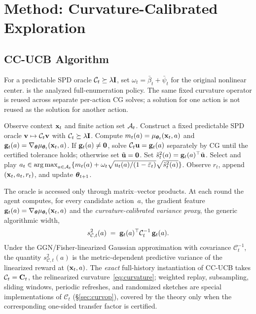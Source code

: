 \documentclass[twoside]{article}
\newcommand{\Calg}{\mathcal{C}}                 %
\begin{document}
\section{Method: Curvature-Calibrated Exploration}\label{sec:method}

\subsection{CC-UCB Algorithm}

For a predictable SPD oracle $\Calg_t\succeq\lambda\bI$, set
$\omega_t=\bar\beta_t+\bar\psi_t$ for the original nonlinear center.
 is the analyzed full-enumeration policy.  The same fixed
curvature operator is reused across separate per-action CG solves; a solution
for one action is not reused as the solution for another action.
\begin{algorithm}[H]
\caption{Curvature-Calibrated UCB (CC-UCB)}\label{alg:ccucb}
\begin{algorithmic}[1]
\STATE Observe context $\mathbf{x}_t$ and finite action set $\mathcal{A}_t$.
\STATE Construct a fixed predictable SPD oracle $\bv\mapsto\Calg_t\bv$ with $\Calg_t\succeq\lambda\bI$.
  \STATE Compute $m_t(a)=\mu_{\boldsymbol{\theta}_t}(\mathbf{x}_t,a)$ and $\mathbf{g}_t(a)=\nabla_{\boldsymbol{\theta}}\mu_{\boldsymbol{\theta}_t}(\mathbf{x}_t,a)$.
  \STATE If $\mathbf{g}_t(a)\ne\mathbf0$, solve $\Calg_t\bu=\bg_t(a)$ separately by CG until the certified tolerance holds; otherwise set $\tilde{\mathbf{u}}=\mathbf0$. \label{line:cg}
  \STATE Set $\tilde s_t^2(a)=\mathbf{g}_t(a)^\top\tilde{\mathbf{u}}$.
\ENDFOR
\STATE Select and play $a_t\in\operatorname*{arg\,max}_{a\in\mathcal{A}_t}\{m_t(a)+\omega_t\sqrt{u_t(a)/(1-\bar\varepsilon_t)}\sqrt{\tilde s_t^2(a)}\}$. \label{line:ucb}
\STATE Observe $r_t$, append $(\mathbf{x}_t,a_t,r_t)$, and update $\boldsymbol{\theta}_{t+1}$.
\end{algorithmic}
\end{algorithm}

The oracle is accessed only through matrix--vector products.  At each round the
agent computes,
for every candidate action~$a$, the gradient feature
$\mathbf{g}_t(a)=\nabla_{\boldsymbol{\theta}}\mu_{\boldsymbol{\theta}_t}(\mathbf{x}_t,a)$ and the
\emph{curvature-calibrated variance proxy}, the generic algorithmic width,
\begin{equation}\label{eq:variance}
  s_{\Calg,t}^2(a)
  \;=\;
  \bg_t(a)^\top\Calg_t^{-1}\,\bg_t(a).
\end{equation}
Under the GGN/Fisher-linearized Gaussian approximation with covariance
$\Calg_t^{-1}$, the quantity $s_{\Calg,t}^2(a)$ is the metric-dependent
predictive variance of the linearized reward at $(\mathbf{x}_t,a)$.
The \emph{exact} full-history instantiation of CC-UCB takes $\Calg_t=\bC_t$, the
relinearized curvature~\eqref{eq:curvature}; weighted replay, subsampling,
sliding windows, periodic refreshes, and randomized sketches are special
implementations of $\Calg_t$ (\S\ref{sec:curvop}), covered by the theory only
when the corresponding one-sided transfer factor is certified.
\end{document}
